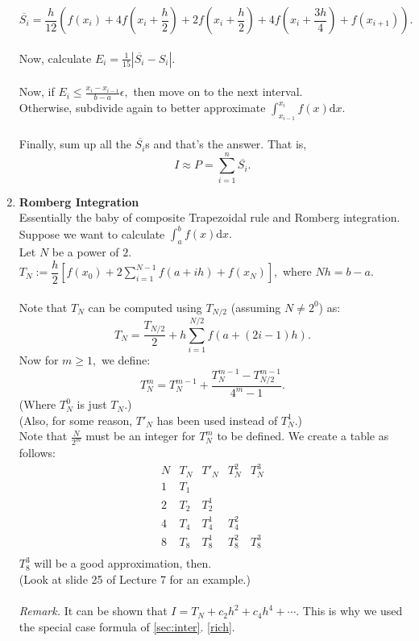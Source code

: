 \documentclass{article}
\begin{document}
\begin{enumerate}
	$\overline{S_i} = \dfrac{h}{12}\left(f(x_i) + 4f\left(x_i + \dfrac{h}{2}\right) + 2f\left(x_i + \dfrac{h}{2}\right) + 4f\left(x_i + \dfrac{3h}{4}\right) + f(x_{i+1})\right).$\\~\\
	Now, calculate $E_i = \frac{1}{15}|\overline{S_i} - S_i|.$\\~\\
	Now, if $E_i \le \frac{x_{i} - x_{i-1}}{b - a}\epsilon,$ then move on to the next interval.\\
	Otherwise, subdivide again to better approximate $\displaystyle\int_{x_{i-1}}^{x_i} f(x) \text{d}x.$\\~\\
	Finally, sum up all the $\overline{S_i}$s and that's the answer. That is,
	\[I \approx P = \sum_{i=1}^{n}\overline{S_i}.\]
	\item \textbf{Romberg Integration}\\
	Essentially the baby of composite Trapezoidal rule and Romberg integration.\\
	Suppose we want to calculate $\displaystyle\int_{a}^{b} f(x) \text{d}x.$\\
	Let $N$ be a power of $2$.\\
	$T_N := \dfrac{h}{2}\left[f(x_0) + 2\displaystyle\sum_{i=1}^{N-1}f(a + ih) + f(x_N)\right],$ where $Nh = b-a.$\\~\\
	Note that $T_N$ can be computed using $T_{N/2}$ (assuming $N \neq 2^0$) as:
	\[T_N = \frac{T_{N/2}}{2} + h\sum_{i=1}^{N/2}f\left(a + (2i - 1)h\right).\]
	Now for $m \ge 1,$ we define:
	\[T^{m}_N = T^{m-1}_N + \frac{T^{m-1}_N - T^{m-1}_{N/2}}{4^m - 1}.\]
	(Where $T^{0}_N$ is just $T_N.$)\\
	(Also, for some reason, $T'_N$ has been used instead of $T^1_N$.)\\
	Note that $\frac{N}{2^m}$ must be an integer for $T^m_N$ to be defined.
	We create a table as follows:\\
		\[
		\begin{array}{c|c|c|c|c}
			N & T_N & T'_N & T^2_N & T^3_N\\
			\hline
			1 & T_1 & & &\\
			2 & T_2 & T^1_2 & & \\
			4 & T_4 & T^1_4 & T^2_4 & \\
			8 & T_8 & T^1_8 & T^2_8 & T^3_8 \\
		\end{array}
		\]
	$T^3_8$ will be a good approximation, then.\\
	(Look at slide 25 of Lecture 7 for an example.)\\~\\
	\emph{Remark.} It can be shown that $I = T_N + c_2h^2 + c_4h^4 + \cdots.$ This is why we used the special case formula of \ref{sec:inter}. \ref{rich}.
\end{enumerate}
\end{document}
